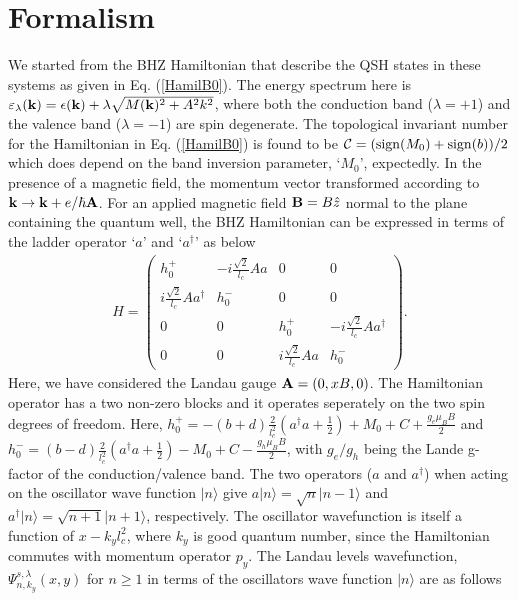 \documentclass[prb,twocolumn]{revtex4-1}
\begin{document}
\section{Formalism}\label{Formalism}


We started from the BHZ Hamiltonian that describe the QSH states in these systems as given in Eq. (\ref{HamilB0}).
The energy spectrum here is $\varepsilon_\lambda({\bf k})=\epsilon({\bf k})+\lambda\sqrt{M({\bf k})^2+A^2k^2}$, where both the conduction band ($\lambda=+1$) and the valence band ($\lambda=-1$) are spin degenerate. 
The topological invariant number for the Hamiltonian in Eq. (\ref{HamilB0}) is found to be $\mathcal{C}=({\rm sign}(M_0)+{\rm sign}(b))/2$ which does depend on the band inversion parameter, `$M_0$', expectedly.
In the presence of a magnetic field, the momentum vector transformed according to ${\bf k}\rightarrow {\bf k}+e/\hbar {\bf A}$. For an applied magnetic field ${\bf B} = B \hat z$ normal to the plane containing the quantum well, the BHZ Hamiltonian can be expressed in terms of the ladder operator `$a$' and `$a^\dagger$' as below
\begin{eqnarray}
H=\begin{pmatrix}
h_0^+  & -i\frac{\sqrt{2}}{l_c}A a &0 &0\\
i\frac{\sqrt{2}}{l_c}A a^\dagger&h_0^- & 0 & 0\\
0 & 0& h_0^+ &-i\frac{\sqrt{2}}{l_c}A a^\dagger\\
0 & 0& i\frac{\sqrt{2}}{l_c}A a & h_0^-
\end{pmatrix}.
\end{eqnarray}
Here, we have considered the Landau gauge ${\bf{A}}=(0,xB,0)$. The Hamiltonian operator has a two non-zero blocks and it operates seperately on the two spin degrees of freedom. Here,
$h_0^+=-(b+d)\frac{2}{l_c^2}(a^\dagger a+\frac{1}{2})+M_0+C+\frac{g_e\mu_B B}{2}$
and 
$h_0^-= (b-d)\frac{2}{l_c^2}(a^\dagger a+\frac{1}{2})-M_0+C-\frac{g_h\mu_B B}{2}$, with $g_e/g_h$ being the Lande g-factor of the conduction/valence band. The two operators ($a$ and $a^\dagger$) when acting on the oscillator wave function $\vert n\rangle$ give $a\vert n\rangle=\sqrt{n}\vert n-1\rangle$ and $a^\dagger\vert n\rangle=\sqrt{n+1}\vert n+1\rangle$, respectively. The oscillator wavefunction is itself a function of $x-k_yl_c^2$, where $k_y$ is good quantum number, since the Hamiltonian commutes with momentum operator $p_y$. 
The Landau levels wavefunction, $\Psi_{n,k_y}^{s,\lambda}(x,y)$ for $n\ge 1$ in terms of the oscillators wave function $\vert n\rangle$ are as follows
\end{document}
